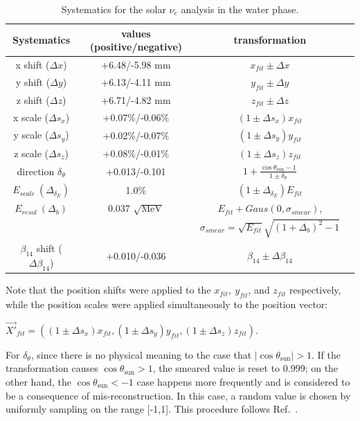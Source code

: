 \begin{table}[ht]
	\centering
	\caption{Systematics for the solar $\nu_e$ analysis in the water phase.}
	\label{tab:solar_uncertainties}
	\begin{tabular*}{150mm}{c@{\extracolsep{\fill}}ccc}
		\toprule
		Systematics & values (positive/negative) & transformation   \\
		\hline
		x shift ($\Delta x$) & +6.48/-5.98 mm  & $x_{fit}\pm \Delta x$ \\	
		y shift ($\Delta y$)& +6.13/-4.11 mm   & $y_{fit}\pm \Delta y$ \\
		z shift ($\Delta z$)& +6.71/-4.82 mm   & $z_{fit}\pm \Delta z$ \\
		x scale ($\Delta s_x$)& +0.07\%/-0.06\%  & $(1\pm \Delta s_x)x_{fit}$\\	
		y scale ($\Delta s_y$)& +0.02\%/-0.07\%  & $(1\pm \Delta s_y)y_{fit}$ \\
		z scale ($\Delta s_z$)& +0.08\%/-0.01\%  & $(1\pm \Delta s_z)z_{fit}$ \\
		direction $\delta_\theta$  & +0.013/-0.101 & $1+\frac{\cos\theta_\mathrm{sun}-1}{1\pm\delta_\theta}$\\
		$E_{scale}~(\Delta_{\delta_E})$ &  1.0\%  & $(1\pm \Delta_{\delta_E})E_{fit}$\\
		$E_{resol}~(\Delta_b)$ &  0.037 $\sqrt{\mathrm{MeV}}$  & $E_{fit}+Gaus(0,\sigma_{smear})$, \\
		& &$\sigma_{smear}=\sqrt{E_{fit}}\sqrt{(1+\Delta_b)^2-1}$\\
		$\beta_{14}$ shift ($\Delta \beta_{14}$) & +0.010/-0.036 & $\beta_{14}\pm \Delta \beta_{14}$\\
		\bottomrule
	\end{tabular*}
\end{table}

Note that the position shifts were applied to the $x_{fit},~y_{fit}$, and $z_{fit}$ respectively, while the position scales were applied simultaneously to the position vector: 

$\vec{X'}_{fit}=((1\pm \Delta s_x)x_{fit},(1\pm \Delta s_y)y_{fit},(1\pm \Delta s_z)z_{fit})$.

For $\delta_\theta$, since there is no physical meaning to the case that $\vert \cos\theta_\mathrm{sun} \vert >1$. If the transformation causes $\cos\theta_\mathrm{sun}>1$, the smeared value is reset to 0.999; on the other hand, the $\cos\theta_\mathrm{sun}<-1$ case happens more frequently and is considered to be a consequence of mis-reconstruction. In this case, a random value is chosen by uniformly sampling on the range [-1,1]. This procedure follows Ref.~\cite{waterunidoc}.

